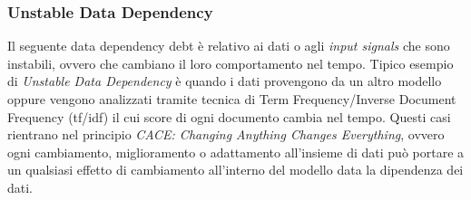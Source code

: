 \subsubsection{Unstable Data Dependency}
Il seguente data dependency debt è relativo ai dati o agli \textit{input signals} che sono instabili, ovvero che cambiano il loro comportamento nel tempo.
Tipico esempio di \textit{Unstable Data Dependency} è quando i dati provengono da un altro modello oppure vengono analizzati tramite tecnica di Term Frequency/Inverse Document Frequency (tf/idf) \cite{datamining_rajaraman} il cui score di ogni documento cambia nel tempo.
Questi casi rientrano nel principio \textit{CACE: Changing Anything Changes Everything}, ovvero ogni cambiamento, miglioramento o adattamento all'insieme di dati può portare a un qualsiasi effetto di cambiamento all'interno del modello data la dipendenza dei dati.


